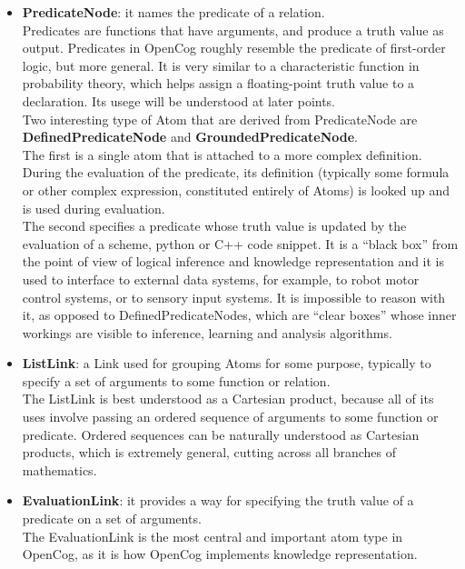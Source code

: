 \begin{itemize}
	\item \textbf{PredicateNode}: it names the predicate of a relation. \\
Predicates are functions that have arguments, and produce a truth value as output. Predicates in OpenCog roughly resemble the predicate of first-order logic, but more general. It is very similar to a characteristic function in probability theory, which helps assign a floating-point truth value to a declaration. Its usege will be understood at later points. \\
Two interesting type of Atom that are derived from PredicateNode are \textbf{DefinedPredicateNode} and \textbf{GroundedPredicateNode}. \\
The first is a single atom that is attached to a more complex definition. During the evaluation of the predicate, its definition (typically some formula or other complex expression, constituted entirely of Atoms) is looked up and is used during evaluation. \\
The second specifies a predicate whose truth value is updated by the evaluation of a scheme, python or C++ code snippet. It is a \enquote{black box} from the point of view of logical inference and knowledge representation and it is used to interface to external data systems, for example, to robot motor control systems, or to sensory input systems. It is impossible to reason with it, as opposed to DefinedPredicateNodes, which are \enquote{clear boxes} whose inner workings are visible to inference, learning and analysis algorithms.

	\item \textbf{ListLink}: a Link used for grouping Atoms for some purpose, typically to specify a set of arguments to some function or relation. \\
The ListLink is best understood as a Cartesian product\footnotemark{}, because all of its uses involve passing an ordered sequence of arguments to some function or predicate. Ordered sequences can be naturally understood as Cartesian products, which is extremely general, cutting across all branches of mathematics.

	\item \textbf{EvaluationLink}: it provides a way for specifying the truth value of a predicate on a set of arguments. \\
The EvaluationLink is the most central and important atom type in OpenCog, as it is how OpenCog implements knowledge representation.


\end{itemize}
